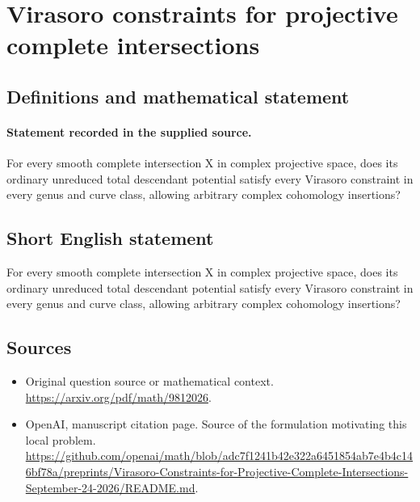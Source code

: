 \documentclass[11pt]{article}
\begin{document}
\section*{Virasoro constraints for projective complete intersections}\label{statement}
\subsection{Definitions and mathematical statement}
\paragraph{Statement recorded in the supplied source.}
For every smooth complete intersection X in complex projective space, does its ordinary unreduced total descendant potential satisfy every Virasoro constraint in every genus and curve class, allowing arbitrary complex cohomology insertions?
\subsection{Short English statement}
For every smooth complete intersection X in complex projective space, does its ordinary unreduced total descendant potential satisfy every Virasoro constraint in every genus and curve class, allowing arbitrary complex cohomology insertions?
\subsection{Sources}
\begin{itemize}
\item[S1] Original question source or mathematical context.
\url{https://arxiv.org/pdf/math/9812026}.
\item[S2] OpenAI, manuscript citation page. Source of the formulation motivating this local problem.
\url{https://github.com/openai/math/blob/adc7f1241b42e322a6451854ab7e4b4c146bf78a/preprints/Virasoro-Constraints-for-Projective-Complete-Intersections-September-24-2026/README.md}.
\end{itemize}
\end{document}

